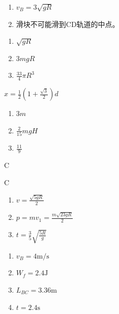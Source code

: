 \item \begin {enumerate} \renewcommand {\labelenumi }{\arabic {enumi}.} \item $v_{B}=3 \sqrt {g R}$ \par \item 滑块不可能滑到CD轨道的中点。 \end {enumerate} \par \par 
\item \begin {enumerate} \renewcommand {\labelenumi }{\arabic {enumi}.} \item $\sqrt {g R}$ \item $3 m g R$ \item $\frac {33}{4} \pi R^{3}$ \par \par \par \end {enumerate} \par \par 
\item $x=\frac {1}{2}\left (1+\frac {\sqrt {3}}{2}\right ) d$
\item \begin {enumerate} \renewcommand {\labelenumi }{\arabic {enumi}.} \item $3 m$ \item $\frac {2}{15}mgH$ \item $\frac {11}{9}$ \par \par \par \end {enumerate} \par \par 
\item C
\item C
\item \begin {enumerate} \renewcommand {\labelenumi }{\arabic {enumi}.} \item $v=\frac {\sqrt {5 g R}}{2}$ \item $p=m v_{1}=\frac {m \sqrt {23 g R}}{2}$ \item $t=\frac {3}{5} \sqrt {\frac {5 R}{g}}$ \end {enumerate} \par \par 
\item \begin {enumerate} \renewcommand {\labelenumi }{\arabic {enumi}.} \item $v_{B}=4 \mathrm {m} / \mathrm {s}$ \item $W_{f}=2.4 \mathrm {J}$ \item $L_{B C}=3.36 \mathrm {m}$ \item $t=2.4 \mathrm {s}$ \end {enumerate} \par \par 
